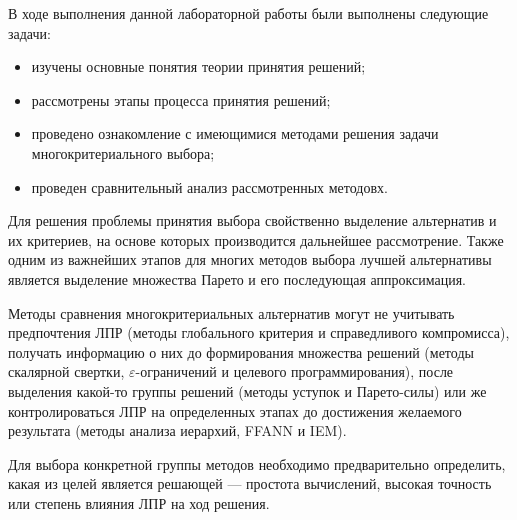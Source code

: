 
В ходе выполнения данной лабораторной работы были выполнены следующие задачи:
\begin{itemize}
	\item изучены основные понятия теории принятия решений;
	\item рассмотрены этапы процесса принятия решений;
	\item проведено ознакомление с имеющимися методами решения задачи многокритериального выбора;
	\item проведен сравнительный анализ рассмотренных методовх.
\end{itemize}

Для решения проблемы принятия выбора свойственно выделение альтернатив и их критериев, на основе которых производится дальнейшее рассмотрение. Также одним из важнейших этапов для многих методов выбора лучшей альтернативы является выделение множества Парето и его последующая аппроксимация. 

Методы сравнения многокритериальных альтернатив могут не учитывать предпочтения ЛПР (методы глобального критерия и справедливого компромисса), получать информацию о них до формирования множества решений (методы скалярной свертки, $\varepsilon$-ограничений и целевого программирования), после выделения какой-то группы решений (методы уступок и Парето-силы) или же контролироваться ЛПР на определенных этапах до достижения желаемого результата (методы анализа иерархий, FFANN и IEM).

Для выбора конкретной группы методов необходимо предварительно определить, какая из целей является решающей --- простота вычислений, высокая точность или степень влияния ЛПР на ход решения.
